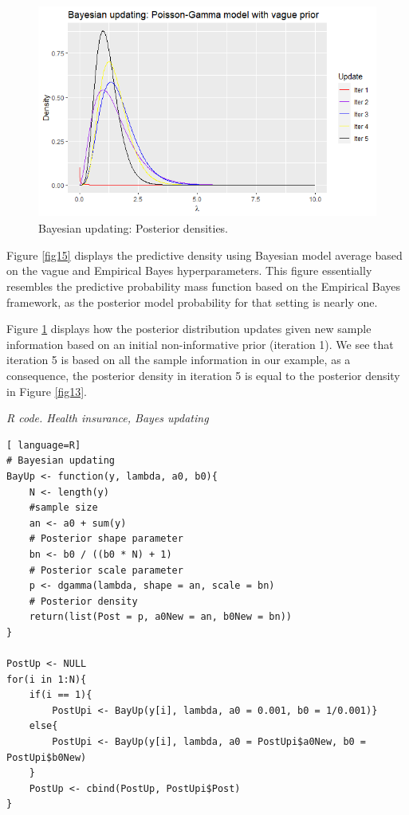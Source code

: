 \begin{figure}[!h]
	\includegraphics[width=340pt, height=200pt]{Chapters/chapter1/figures/Updating.png}
	\caption[List of figure caption goes here]{Bayesian updating: Posterior densities.}\label{fig16}
\end{figure}

Figure \ref{fig15} displays the predictive density using Bayesian model average based on the vague and Empirical Bayes hyperparameters. This figure essentially resembles the predictive probability mass function based on the Empirical Bayes framework, as the posterior model probability for that setting is nearly one.

Figure \ref{fig16} displays how the posterior distribution updates given new sample information based on an initial non-informative prior (iteration 1). We see that iteration 5 is based on all the sample information in our example, as a consequence, the posterior density in iteration 5 is equal to the posterior density in Figure \ref{fig13}.

\begin{tcolorbox}[enhanced,width=4.67in,center upper,
	fontupper=\large\bfseries,drop shadow southwest,sharp corners]
\textit{R code. Health insurance, Bayes updating}
\begin{VF}
\begin{lstlisting}[ language=R]
# Bayesian updating
BayUp <- function(y, lambda, a0, b0){
	N <- length(y)
	#sample size
	an <- a0 + sum(y) 
	# Posterior shape parameter
	bn <- b0 / ((b0 * N) + 1) 
	# Posterior scale parameter
	p <- dgamma(lambda, shape = an, scale = bn) 
	# Posterior density
	return(list(Post = p, a0New = an, b0New = bn))
}

PostUp <- NULL
for(i in 1:N){
	if(i == 1){
		PostUpi <- BayUp(y[i], lambda, a0 = 0.001, b0 = 1/0.001)}
	else{
		PostUpi <- BayUp(y[i], lambda, a0 = PostUpi$a0New, b0 = PostUpi$b0New)
	}
	PostUp <- cbind(PostUp, PostUpi$Post)
}

\end{lstlisting}
\end{VF}
\end{tcolorbox}

